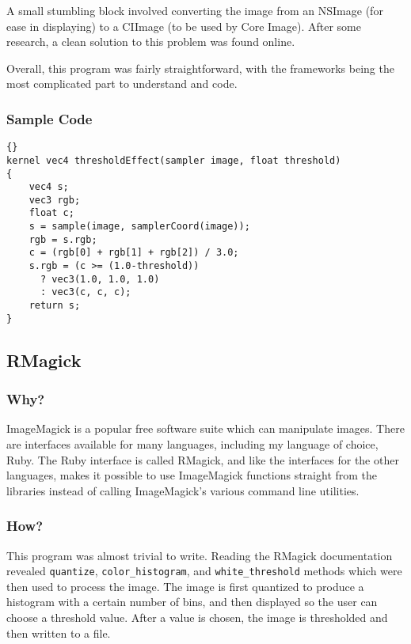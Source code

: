 \documentclass[11pt]{article}
\begin{document}
A small stumbling block involved converting the image from an NSImage (for ease in displaying) to a CIImage (to be used by Core Image). After some research, a clean solution to this problem was found online.

Overall, this program was fairly straightforward, with the frameworks being the most complicated part to understand and code.

\subsubsection{Sample Code}

\begin{lstlisting}[frame=trbl]{}
kernel vec4 thresholdEffect(sampler image, float threshold)
{
	vec4 s;
	vec3 rgb;
	float c;
	s = sample(image, samplerCoord(image));
	rgb = s.rgb;
	c = (rgb[0] + rgb[1] + rgb[2]) / 3.0;
	s.rgb = (c >= (1.0-threshold))
	  ? vec3(1.0, 1.0, 1.0)
	  : vec3(c, c, c);
	return s;
}
\end{lstlisting}

\subsection{RMagick}

\subsubsection{Why?}

ImageMagick is a popular free software suite which can manipulate images. There are interfaces available for many languages, including my language of choice, Ruby. The Ruby interface is called RMagick, and like the interfaces for the other languages, makes it possible to use ImageMagick functions straight from the libraries instead of calling ImageMagick's various command line utilities.

\subsubsection{How?}

This program was almost trivial to write. Reading the RMagick documentation revealed \verb|quantize|, \verb|color_histogram|, and \verb|white_threshold| methods which were then used to process the image. The image is first quantized to produce a histogram with a certain number of bins, and then displayed so the user can choose a threshold value. After a value is chosen, the image is thresholded and then written to a file.
\end{document}

